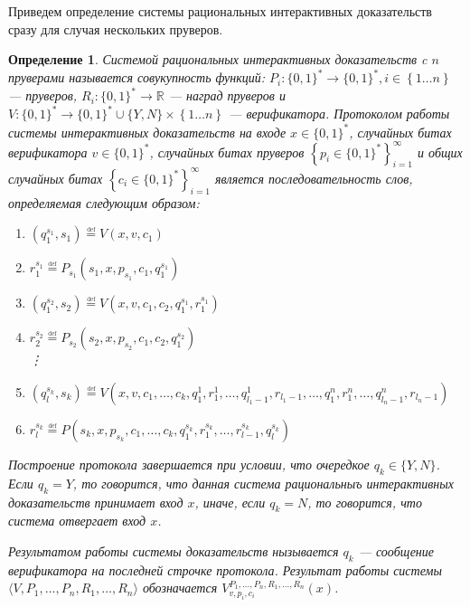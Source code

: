 \documentclass[14pt, a4paper, russian]{report}
\newtheorem{definition}{\indent Определение}
\newcommand{\word}{\{0, 1\}^*}
\newcommand{\defeq}{\overset{\underset{\mathrm{def}}{}}{=}}
\newcommand{\set}[1]{\left\{#1\right\}}
\begin{document}
Приведем определение системы рациональных интерактивных доказательств сразу для случая нескольких пруверов.
\begin{definition}
    Системой рациональных интерактивных доказательств c $n$ пруверами называется совукупность функций: $P_i: \word \longrightarrow \word, i \in \set{1\ldots n}$ --- пруверов, $R_i: \word \longrightarrow \mathbb{R}$ --- наград пруверов и $V: \word \longrightarrow \word \cup \{Y, N\} \times \set{1 \dots n}$ --- верификатора. Протоколом работы системы интерактивных доказательств на входе $x \in \word$, случайных битах верификатора $v \in \word$, случайных битах пруверов $\left\{p_i\in \word\right\}_{i=1}^{\infty}$ и общих случайных битах $\left\{c_i\in \word\right\}_{i=1}^{\infty}$ является последовательность слов, определяемая следующим образом:
    \begin{enumerate}
        \item $(q^{s_1}_1, s_1) \defeq V(x, v, c_1)$
        \item $r^{s_1}_1 \defeq P_{s_1}(s_1, x, p_{s_1}, c_1, q^{s_1}_1)$
        \item $(q^{s_2}_1, s_2) \defeq V(x, v, c_1, c_2, q^{s_1}_1, r^{s_1}_1)$
        \item $r^{s_2}_2 \defeq P_{s_2}(s_2, x, p_{s_2}, c_1, c_2, q^{s_2}_1)$\\
            \vdots
        \item $(q^{s_k}_l, s_k) \defeq V(x, v, c_1, \ldots, c_k, q^1_1, r^1_1, \ldots, q^1_{l_1-1}, r_{l_1-1}, \ldots, q^n_1, r^n_1, \ldots, q^n_{l_n-1}, r_{l_n-1})$
        \item $r^{s_k}_l \defeq P(s_k, x, p_{s_k}, c_1, \ldots, c_k, q^{s_k}_1, r^{s_k}_1, \ldots, r^{s_k}_{l-1}, q^{s_k}_l)$
    \end{enumerate}
    Построение протокола завершается при условии, что очередкое $q_k \in \{Y, N\}$. Если $q_k = Y$, то говорится, что данная система рациональныъ интерактивных доказательств принимает вход $x$, иначе, если $q_k = N$, то говорится, что система отвергает вход $x$.

    Результатом работы системы доказательств нызывается $q_k$ --- сообщение верификатора на последней строчке протокола. Результат работы системы $\langle V, P_1, \ldots, P_n, R_1, \ldots, R_n\rangle$ обозначается $V^{P_1, \ldots, P_n, R_1, \ldots, R_n}_{v, p_i, c_i}(x)$.
\end{definition}
\end{document}
